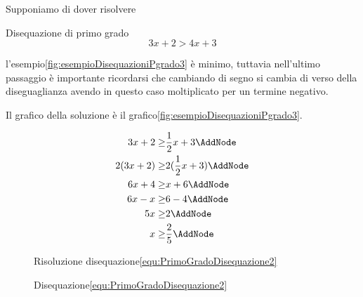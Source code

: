 Supponiamo di dover risolvere 
\begin{esempiot}{Disequazione di primo grado}{}
\begin{equation}
3x+2>4x+3\label{equ:PrimoGradoDisequazione3}
\end{equation}
\end{esempiot}
 l'esempio\nobs\vref{fig:esempioDisequazioniPgrado3} è minimo, tuttavia nell'ultimo passaggio è importante ricordarsi che cambiando di segno si cambia di verso della diseguaglianza  avendo in questo caso moltiplicato per un termine negativo.\par
Il grafico della soluzione è il grafico\nobs\vref{fig:esempioDisequazioniPgrado3}.  
\begin{figure}
	 
\begin{NodesList}
\begin{align*}
	3x+2\geq&\dfrac{1}{2}x+3\AddNode\\
	2(3x+2)\geq&2(\dfrac{1}{2}x+3)\AddNode\\ %
	6x+4\geq&x+6\AddNode\\
	6x-x\geq&6-4\AddNode\\
	5x\geq&2\AddNode\\
	x\geq&\dfrac{2}{5}\AddNode
\end{align*}
\LinkNodes{%
}
\LinkNodes{
}%
\LinkNodes{
}%
\LinkNodes{%
}%
\LinkNodes{%
}
\end{NodesList}

\captionsetup{format=esempio,list=no}\caption{Risoluzione disequazione\nobs\vref{equ:PrimoGradoDisequazione2}}
\label{fig:esempioDisequazioniPgrado2}
\end{figure}
\begin{figure}
	\centering
	\captionsetup{format=grafico,list=no}
	\caption{Disequazione\nobs\vref{equ:PrimoGradoDisequazione2}}
	\label{fig:esempioDisequazioniPgradografico2}
\end{figure}
